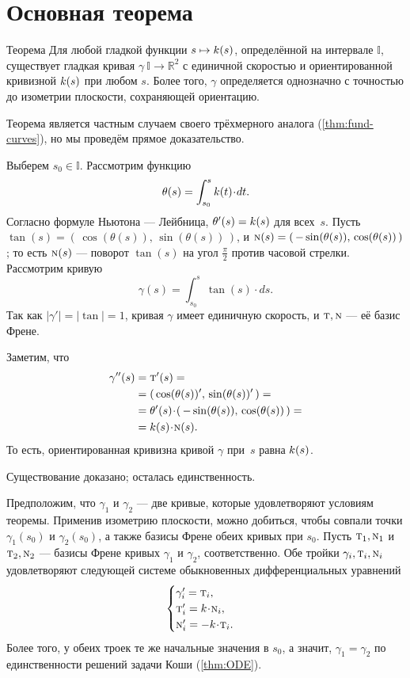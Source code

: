 \section{Основная теорема}

\begin{thm}{Теорема}\label{thm:fund-curves-2D}
Для любой гладкой функции $s\mapsto k(s)$, определённой на интервале $\mathbb{I}$,
существует гладкая кривая $\gamma\:\mathbb{I}\to\mathbb{R}^2$ с единичной скоростью и ориентированной кривизной $k(s)$ при любом $s$.
Более того, $\gamma$ определяется однозначно с точностью до изометрии плоскости, сохраняющей ориентацию.
\end{thm}

Теорема является частным случаем своего трёхмерного аналога (\ref{thm:fund-curves}), но мы проведём прямое доказательство.


Выберем $s_0\in\mathbb{I}$.
Рассмотрим функцию
\[\theta(s)
=
\int_{s_0}^s\skur(t)\cdot dt.\]
Согласно формуле Ньютона --- Лейбница, $\theta'(s)\z=\skur(s)$ для всех~$s$.
Пусть 
$\tan(s)=(\,\cos(\theta(s)),\,\sin(\theta(s))\,)$,
и $\text{\sc{n}}(s)=(\,-\sin(\theta(s)),\,\cos(\theta(s))\,)$;
то есть $\text{\sc{n}}(s)$ --- поворот $\tan(s)$ на угол $\tfrac\pi2$ против часовой стрелки.
Рассмотрим кривую 
\[\gamma(s)=\int_{s_0}^s\tan(s)\cdot ds.\]
Так как $|\gamma'|=|\tan|=1$, кривая $\gamma$ имеет единичную скорость, и $\text{\sc{t}},\text{\sc{n}}$ --- её базис Френе. 

Заметим, что
\begin{align*}
\gamma''(s)&=\tan'(s)=
\\
&=(\,\cos(\theta(s))',\,\sin(\theta(s))'\,)=
\\
&=\theta'(s)\cdot (\,-\sin(\theta(s)),\,\cos(\theta(s))\,)=
\\
&=\skur(s)\cdot \norm(s).
\end{align*}
То есть, ориентированная кривизна кривой $\gamma$ при~$s$ равна $k(s)$. 

Существование доказано; осталась единственность.

Предположим, что $\gamma_1$ и $\gamma_2$ --- две кривые, которые удовлетворяют условиям теоремы.
Применив изометрию плоскости, можно добиться, чтобы совпали точки $\gamma_1(s_0)$ и $\gamma_2(s_0)$, а также базисы Френе обеих кривых при $s_0$.
Пусть $\text{\sc{t}}_1,\text{\sc{n}}_1$ и $\text{\sc{t}}_2,\text{\sc{n}}_2$ --- базисы Френе кривых $\gamma_1$ и $\gamma_2$, соответственно.
Обе тройки $\gamma_i,\text{\sc{t}}_i,\text{\sc{n}}_i$ удовлетворяют следующей системе обыкновенных дифференциальных уравнений 
\[
\begin{cases}
\gamma_i'=\tan_i,
\\
\tan_i'=\skur\cdot\norm_i,
\\
\norm_i'=-\skur\cdot\tan_i.
\end{cases}
\]
Более того, у обеих троек те же начальные значения в $s_0$,
а значит, $\gamma_1=\gamma_2$ по единственности решений задачи Коши (\ref{thm:ODE}).
\qeds

